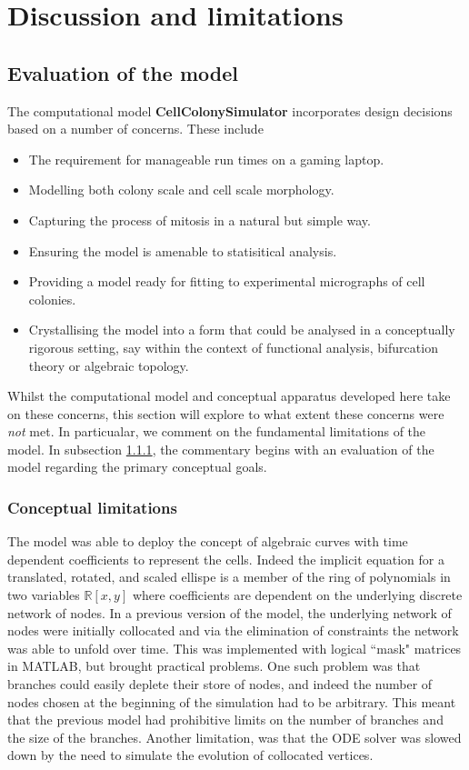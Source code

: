 \chapter{Discussion and limitations}
\section{Evaluation of the model}
The computational model \textbf{CellColonySimulator} incorporates
design decisions based on a number of concerns. These include
\begin{itemize}
    \item The requirement for manageable run times on a gaming laptop.
    \item Modelling both colony scale and cell scale morphology.
    \item Capturing the process of mitosis in a natural but simple way.
    \item Ensuring the model is amenable to statisitical analysis.
    \item Providing a model ready for fitting to experimental micrographs of cell colonies.
    \item Crystallising the model into a form that could be analysed in a conceptually 
          rigorous setting, say within the context of functional analysis,
          bifurcation theory or algebraic topology.
\end{itemize}
Whilst the computational model and conceptual apparatus developed here take on these concerns,
this section will explore to what extent these concerns were \textit{not} met. In particualar, we comment on the
fundamental limitations of the model. In subsection \ref{conceptLims}, the commentary begins 
with an evaluation of the model regarding the primary conceptual goals.

\subsection{Conceptual limitations} \label{conceptLims}
The model was able to deploy the concept of algebraic curves with time dependent coefficients 
to represent the cells. Indeed the implicit equation for a translated, rotated, and scaled ellispe 
is a member of the ring of polynomials in two variables $\mathbb{R}[x,y]$ where coefficients are
dependent on the underlying discrete network of nodes. In a previous version of the model, 
the underlying network of nodes were initially collocated and via the elimination 
of constraints the network was able to unfold over time. This was implemented with
logical ``mask" matrices in MATLAB, but 
brought practical problems. One such problem was that branches 
could easily deplete their store of nodes, and indeed the number of nodes
chosen at the beginning of the simulation had to be arbitrary. This meant that
the previous model had prohibitive limits on the number of branches and the size
of the branches. Another limitation, was that the ODE solver was slowed
down by the need to simulate the evolution of collocated vertices.
\\

